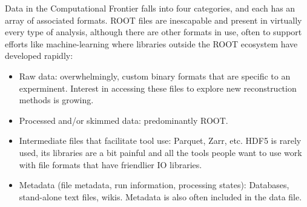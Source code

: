\begin{comment}
Harrison B. Prosper, Sezen Sekmen, Gokhan Unel. ”Analysis Description Language: A DSL for HEP Analysis”, arXiv:2203.09886 [hep-ph] (pdf). (also relevant to CompF07)~\cite{Prosper:2022lnf}
- emphasizes the need for semantic analysis to make collaboration with theory easier
- also makes an analysis self-documenting (Amy: to a degree)
- prefers a language-independent DSL, an "external DSL" for easier interoperability
- identifies DSL requirements as (1) easily understood by a physicist, (2) unambiguous, (3) domain complete.  I feel like (1) and possibly (2) need more clarification for this to be a true requirement list
- people do use the Analysis Description Language (analysis schools, Future Circular Collider studies), not clear if the use is limited to a specific group or groups, no complete LHC analysis yet
- Obvious enhancement of existing DSL would be to re-write to target LLVM.  (Amy: huh, okay, maybe it is time to think about DSLs?)

C. Backhouse. ”The CAFAna framework for neutrino analysis”, arXiv:2203.13768 [hep-ex] (pdf). (also under NF01)~\cite{arxiv.2203.13768}
- I feel like I need to re-read this paper (Amy)
- ROOT format files
- has been used by multiple neutrino experiments!
- connected with STAN to provide MCMC + analytic derivatives
\end{comment}

Data in the Computational Frontier falls into four categories, and each has an array of associated formats.  ROOT files are inescapable and present in virtually every type of analysis, although there are other formats in use, often to support efforts like machine-learning where libraries outside the ROOT ecosystem have developed rapidly:   

\begin{itemize}
  \item Raw data: overwhelmingly, custom binary formats that are specific to an experminent.  Interest in accessing these files to explore new reconstruction methods is growing.
  \item Processed and/or skimmed data: predominantly ROOT.
  \item Intermediate files that facilitate tool use: Parquet, Zarr, etc.  HDF5 is rarely used, its libraries are a bit painful and all the tools people want to use work with file formats that have friendlier IO libraries.
  \item Metadata (file metadata, run information, processing states): Databases, stand-alone text files, wikis.  Metadata is also often included in the data file.
\end{itemize}

